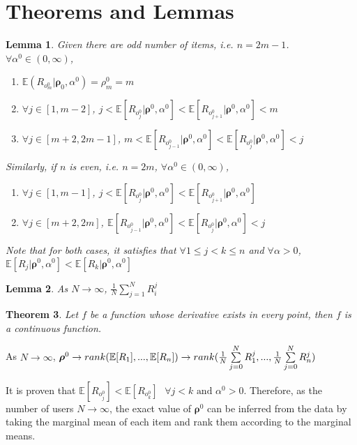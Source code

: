 \documentclass[11pt, oneside]{article}   	%
\newtheorem{theorem}{Theorem}
\newtheorem{lemma}[theorem]{Lemma}
\begin{document}
\section{Theorems and Lemmas}

\begin{lemma}
Given there are odd number of items, i.e. $n = 2m - 1$. $\forall \alpha^0 \in (0, \infty)$,

	\begin{enumerate} 
		\item{$\mathbb{E}(R_{o^0_m}|\bm{\rho}_{0}, \alpha^0) = \rho^0_m = m$ }
		\item{$\forall j \in [1, m-2]$, $j< \mathbb{E}[R_{o^0_j}|\bm{\rho}^0, \alpha^0] <\mathbb{E}[R_{o^0_{j+1}}|\bm{\rho}^0, \alpha^0] < m$}
		\item{$\forall j \in [m+2, 2m-1]$, $m< \mathbb{E}[R_{o^0_{j-1}}|\bm{\rho}^0, \alpha^0] <\mathbb{E}[R_{o^0_{j}}|\bm{\rho}^0, \alpha^0] < j$}
	\end{enumerate}
Similarly, if $n$ is even, i.e. $n = 2m$,  $\forall \alpha^0 \in (0, \infty)$,
	\begin{enumerate} 
	\item{$\forall j \in [1, m-1]$, $j< \mathbb{E}[R_{o^0_j}|\bm{\rho}^0, \alpha^0] <\mathbb{E}[R_{o^0_{j+1}}|\bm{\rho}^0, \alpha^0]$}
	\item{$\forall j \in [m+2, 2m]$, $\mathbb{E}[R_{o^0_{j-1}}|\bm{\rho}^0, \alpha^0] <\mathbb{E}[R_{o^0_{j}}|\bm{\rho}^0, \alpha^0] < j$}
\end{enumerate}
Note that for both cases, it satisfies that $\forall 1\leq j<k\leq n$ and $\forall \alpha > 0 $,
{$\mathbb{E}[R_{j}|\bm{\rho}^0, \alpha^0]<\mathbb{E}[R_{k}|\bm{\rho}^0, \alpha^0]$}
\end{lemma}

\begin{lemma}
 As $N \rightarrow \infty$, $\frac{1}{N}\sum\limits_{j=1}^{N}R^j_i $
\end{lemma}

\begin{theorem}
	Let $f$ be a function whose derivative exists in every point, then $f$ 
	is a continuous function.

\end{theorem}

As $N \rightarrow \infty$, $\bm{\rho}^0 \rightarrow rank(\mathbb{E}[{R}_1],...,\mathbb{E}[{R}_n]) \rightarrow rank({1\over N}\sum\limits_{j=0}^{N}R_1^j,...,{1\over N}\sum\limits_{j=0}^{N}R_n^j)$

It is proven that $\mathbb{E}[R_{o^0_j}] < \mathbb{E}[R_{o^0_k}] \text{ }\forall j<k \text{ and } \alpha^0 >0 $. Therefore, as the number of users $N \rightarrow \infty$, the exact value of $\bm{\rho}^0$ can be inferred from the data by taking the marginal mean of each item and rank them according to the marginal means.
\end{document}
